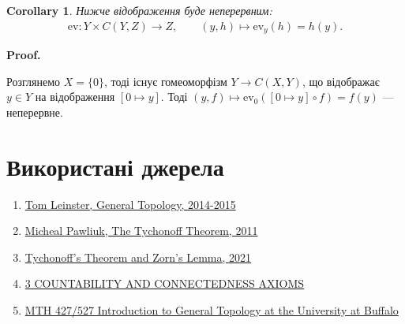 \documentclass[a4paper, 10pt]{article}
\makeatletter
\theoremstyle{theoremdd}
\newtheorem{definition}[theorem]{Definition}
\newtheorem{corollary}[theorem]{Corollary}
\renewenvironment{proof}[1][Proof.\\]{\par
\pushQED{\hfill \qed}%
\normalfont \topsep6\p@\@plus6\p@\relax
\trivlist
\item\relax
{\bfseries
#1\@addpunct{.}}\hspace\labelsep\ignorespaces
}{%
\popQED\endtrivlist\@endpefalse
}
\makeatother
\begin{document}
\begin{corollary}
Нижче відображення буде неперервним:
\begin{align*}
\text{ev} \colon Y \times C(Y,Z) \to Z, \qquad (y,h) \mapsto \text{ev}_y(h) = h(y).
\end{align*}
\end{corollary}

\begin{proof}
Розглянемо $X = \{0\}$, тоді існує гомеоморфізм $Y \to C(X,Y)$, що відображає $y \in Y$ на відображення $[0 \mapsto y]$. Тоді $(y,f) \mapsto \text{ev}_0([0 \mapsto y] \circ f) = f(y)$ --- неперервне.
\end{proof}

\newpage

\section*{Використані джерела}
\begin{enumerate}
\item \href{https://www.maths.ed.ac.uk/~tl/topology/topology_notes.pdf}{Tom Leinster, General Topology, 2014-2015}
\item \href{https://www.math.toronto.edu/~herzig/Tychonoff-lecture.pdf}{Micheal Pawliuk, The Tychonoff Theorem, 2011}
\item \href{https://cronokirby.com/posts/2021/02/tychonoff-theorem-and-zorns-lemma/}{Tychonoff's Theorem and Zorn's Lemma, 2021}
\item \href{https://www.math.auckland.ac.nz/~gauld/750-05/section3.pdf}{3 COUNTABILITY AND CONNECTEDNESS AXIOMS}
\item \href{https://www.youtube.com/watch?v=6yusB-muawU&list=PLfKcn7LuYa_Kr3_aWePrYufu7MMYWYM5-&index=1&ab_channel=mth309}{MTH 427/527 Introduction to General Topology at the University at Buffalo}
\end{enumerate}

\end{document}
